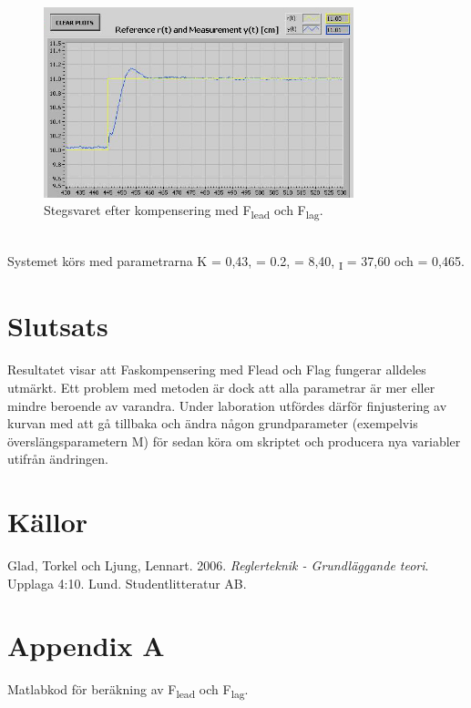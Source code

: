 \documentclass{article}
\begin{document}
\begin{figure}[ht!]
\centering
\includegraphics[width=90mm]{Test2_cut.jpg}
\caption{Stegsvaret efter kompensering med F\textsubscript{lead} och F\textsubscript{lag}.}
\label{overflow}
\end{figure}
~\\

Systemet körs med parametrarna K = 0,43, \textbeta = 0.2,  = 8,40, {\textsubscript{I}} = 37,60 och \textgamma = 0,465. 


\newpage
\section{Slutsats}
Resultatet visar att Faskompensering med Flead och Flag fungerar alldeles utmärkt. Ett problem med metoden är dock att alla parametrar är mer eller mindre beroende av varandra. Under laboration utfördes därför finjustering av kurvan med att gå tillbaka och ändra någon grundparameter (exempelvis överslängsparametern M) för sedan köra om skriptet och producera nya variabler utifrån ändringen.
\newpage


\section{Källor}
Glad, Torkel och Ljung, Lennart. 2006. \textit{Reglerteknik - Grundläggande teori}. Upplaga 4:10. Lund. Studentlitteratur AB.
\newpage


\section{Appendix A}
Matlabkod för beräkning av F\textsubscript{lead} och F\textsubscript{lag}.

\end{document}
